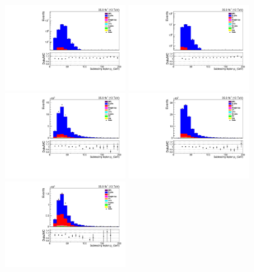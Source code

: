 \begin{figure}[h]
\centering
\includegraphics[width=0.47\textwidth]{figs/background-estimation/plots/unblinded/prompt_ee_ttbarInc/lep2Pt_NPL_ee_lepSel_ee_log.pdf}
\includegraphics[width=0.47\textwidth]{figs/background-estimation/plots/unblinded/prompt_mumu_ttbarInc/lep2Pt_NPL_mumu_lepSel_mumu_log.pdf}
\\
\includegraphics[width=0.47\textwidth]{figs/background-estimation/plots/unblinded/prompt_ee_ttbarInc/lep2Pt_NPL_ee_jetSel_ee.pdf}
\includegraphics[width=0.47\textwidth]{figs/background-estimation/plots/unblinded/prompt_mumu_ttbarInc/lep2Pt_NPL_mumu_jetSel_mumu.pdf}
\\
\includegraphics[width=0.47\textwidth]{figs/background-estimation/plots/unblinded/prompt_ee_ttbarInc/lep2Pt_NPL_ee_wMass_ee.pdf}

\end{figure}
